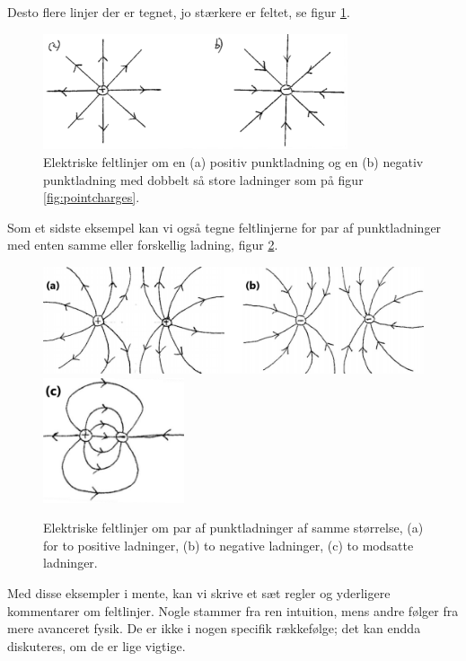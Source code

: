 \noindent Desto flere linjer der er tegnet, jo stærkere er feltet, se figur \ref{fig:pointchargesstrong}. 
\begin{figure}[h!]
    \centering
    \includegraphics[width=0.8\textwidth]{Elektro/Figurer/fieldline_pointcharges2.PNG}
    \caption{Elektriske feltlinjer om en (a) positiv punktladning og en (b) negativ punktladning med dobbelt så store ladninger som på figur \ref{fig:pointcharges}.}
    \label{fig:pointchargesstrong}
\end{figure}
Som et sidste eksempel kan vi også tegne feltlinjerne for par af punktladninger med enten samme eller forskellig ladning, figur \ref{fig:ElectricFieldLinesTwoCharges}.
\begin{figure}[h!]
    \centering
    \includegraphics[width=\textwidth]{Elektro/Figurer/fieldline_twocharges.PNG}
    \newline
    \includegraphics[width=0.37\textwidth]{Elektro/Figurer/fieldline_twocharges2.PNG}
    \caption{Elektriske feltlinjer om par af punktladninger af samme størrelse, (a) for to positive ladninger, (b) to negative ladninger, (c) to modsatte ladninger.}
    \label{fig:ElectricFieldLinesTwoCharges}
\end{figure}
Med disse eksempler i mente, kan vi skrive et sæt regler og yderligere kommentarer om feltlinjer. Nogle stammer fra ren intuition, mens andre følger fra mere avanceret fysik. De er ikke i nogen specifik rækkefølge; det kan endda diskuteres, om de er lige vigtige.
